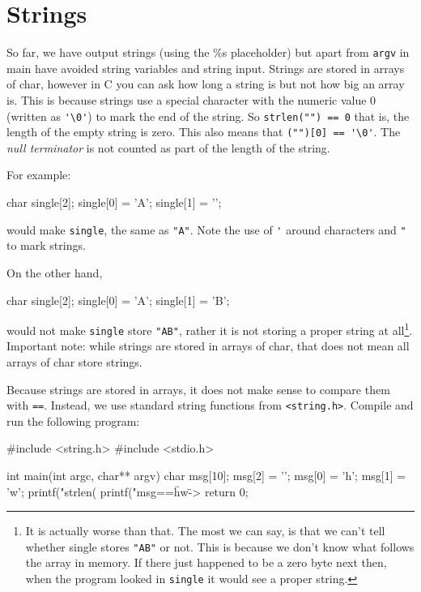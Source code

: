 
\chapter{Strings}



So far, we have output strings (using the \%s placeholder) but apart from \texttt{argv} in main have avoided string variables and string input.
Strings are stored in arrays of char, however in C you can ask how long a string is but not how big an array is.
This is because strings use a special character with the numeric value $0$ (written as \verb!'\0'!) to mark the end of the string.
So \lstinline!strlen("") == 0! that is, the length of the empty string is zero.
This also means that \lstinline!("")[0] == '\0'!.
The \emph{null terminator} is not counted as part of the length of the string.


For example:

\begin{codeblock}
char single[2];
single[0] = 'A';
single[1] = '\0';
\end{codeblock}

would make \texttt{single}, the same as \verb!"A"!.
Note the use of \verb!'! around characters and \verb!"! to mark strings.

On the other hand,
\begin{codeblock}
char single[2];
single[0] = 'A';
single[1] = 'B';
\end{codeblock}
would not make \texttt{single} store \verb!"AB"!, rather it is not storing a proper string at all\footnote{It is actually worse than that.
The most we can say, is that we can't tell whether single stores \texttt{"AB"} or not.
This is because we don't know what follows the array in memory.
If there just happened to be a zero byte next then, when the program looked in \texttt{single} it would see a proper string.
}.
Important note: while strings are stored in arrays of char, that does not mean all arrays of char store strings.

Because strings are stored in arrays, it does not make sense to compare them with \texttt{==}.
Instead, we use standard string functions from \lstinline{<string.h>}.
Compile and run the following program:
\begin{codeblock}
#include <string.h>
#include <stdio.h>

int main(int argc, char** argv) {
    char msg[10];	
    msg[2] = '\0';
    msg[0] = 'h';
    msg[1] = 'w';
    printf("strlen(%
    printf("msg==\"hw\" -> %
    return 0;
}
\end{codeblock}

